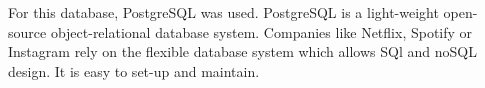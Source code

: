 For this database, PostgreSQL was used.
PostgreSQL is a light-weight open-source object-relational database system. 
Companies like Netflix, Spotify or Instagram \parencite{postgresUsers} rely on the flexible database system which allows SQl and noSQL design.
It is easy to set-up and maintain. 


